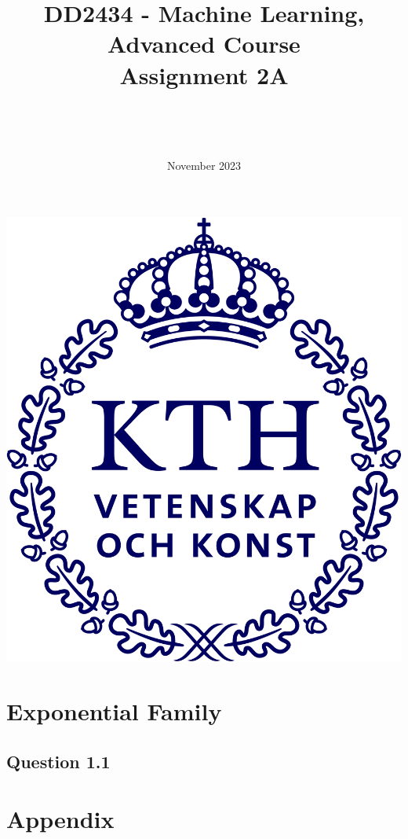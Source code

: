 \documentclass{article}
\title{DD2434 - Machine Learning, Advanced Course \\ Assignment 2A}
\author{\authorFst \\ \emailFst \and \authorSnd \\ \emailSnd}
\date{November 2023}
\begin{document}
\maketitle

\begin{center}
    \includegraphics[scale=0.5]{KTH_logo_RGB_bla.png}
\end{center}

\thispagestyle{empty}

\newpage
\tableofcontents
\newpage

\section{Exponential Family}

\subsection{Question 1.1}

\newpage
\appendix
\section{Appendix}
\end{document}
